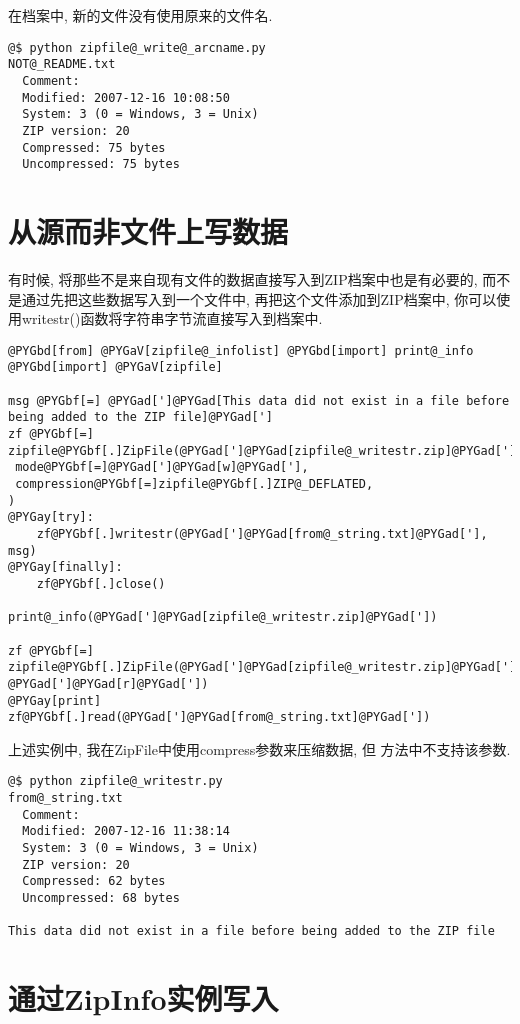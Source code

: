 \documentclass[a4paper,10pt,english]{manual}
\begin{document}
在档案中, 新的文件没有使用原来的文件名.

\begin{Verbatim}[commandchars=@\[\]]
@$ python zipfile@_write@_arcname.py
NOT@_README.txt
  Comment:
  Modified: 2007-12-16 10:08:50
  System: 3 (0 = Windows, 3 = Unix)
  ZIP version: 20
  Compressed: 75 bytes
  Uncompressed: 75 bytes
\end{Verbatim}


\section{从源而非文件上写数据}

有时候, 将那些不是来自现有文件的数据直接写入到ZIP档案中也是有必要的, 而不是通过先把这些数据写入到一个文件中, 再把这个文件添加到ZIP档案中, 你可以使用writestr()函数将字符串字节流直接写入到档案中.

\begin{Verbatim}[commandchars=@\[\]]
@PYGbd[from] @PYGaV[zipfile@_infolist] @PYGbd[import] print@_info
@PYGbd[import] @PYGaV[zipfile]

msg @PYGbf[=] @PYGad[']@PYGad[This data did not exist in a file before being added to the ZIP file]@PYGad[']
zf @PYGbf[=] zipfile@PYGbf[.]ZipFile(@PYGad[']@PYGad[zipfile@_writestr.zip]@PYGad['],
 mode@PYGbf[=]@PYGad[']@PYGad[w]@PYGad['],
 compression@PYGbf[=]zipfile@PYGbf[.]ZIP@_DEFLATED,
)
@PYGay[try]:
    zf@PYGbf[.]writestr(@PYGad[']@PYGad[from@_string.txt]@PYGad['], msg)
@PYGay[finally]:
    zf@PYGbf[.]close()

print@_info(@PYGad[']@PYGad[zipfile@_writestr.zip]@PYGad['])

zf @PYGbf[=] zipfile@PYGbf[.]ZipFile(@PYGad[']@PYGad[zipfile@_writestr.zip]@PYGad['], @PYGad[']@PYGad[r]@PYGad['])
@PYGay[print] zf@PYGbf[.]read(@PYGad[']@PYGad[from@_string.txt]@PYGad['])
\end{Verbatim}

上述实例中, 我在ZipFile中使用compress参数来压缩数据, 但  方法中不支持该参数.

\begin{Verbatim}[commandchars=@\[\]]
@$ python zipfile@_writestr.py
from@_string.txt
  Comment:
  Modified: 2007-12-16 11:38:14
  System: 3 (0 = Windows, 3 = Unix)
  ZIP version: 20
  Compressed: 62 bytes
  Uncompressed: 68 bytes

This data did not exist in a file before being added to the ZIP file
\end{Verbatim}


\section{通过ZipInfo实例写入}
\end{document}
